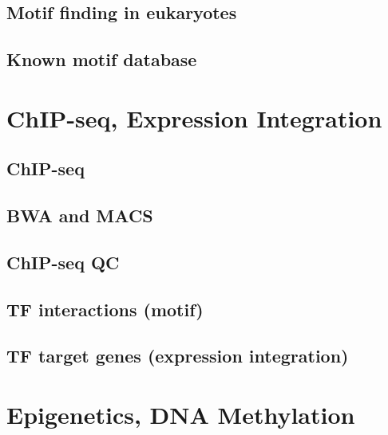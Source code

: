 \documentclass[
]{book}
\begin{document}
\hypertarget{motif-finding-in-eukaryotes}{%
\section{Motif finding in eukaryotes}\label{motif-finding-in-eukaryotes}}

\hypertarget{known-motif-database}{%
\section{Known motif database}\label{known-motif-database}}

\hypertarget{chip}{%
\chapter{ChIP-seq, Expression Integration}\label{chip}}

\hypertarget{chip-seq}{%
\section{ChIP-seq}\label{chip-seq}}

\hypertarget{bwa-and-macs}{%
\section{BWA and MACS}\label{bwa-and-macs}}

\hypertarget{chip-seq-qc}{%
\section{ChIP-seq QC}\label{chip-seq-qc}}

\hypertarget{tf-interactions-motif}{%
\section{TF interactions (motif)}\label{tf-interactions-motif}}

\hypertarget{tf-target-genes-expression-integration}{%
\section{TF target genes (expression integration)}\label{tf-target-genes-expression-integration}}

\hypertarget{epi}{%
\chapter{Epigenetics, DNA Methylation}\label{epi}}
\end{document}
